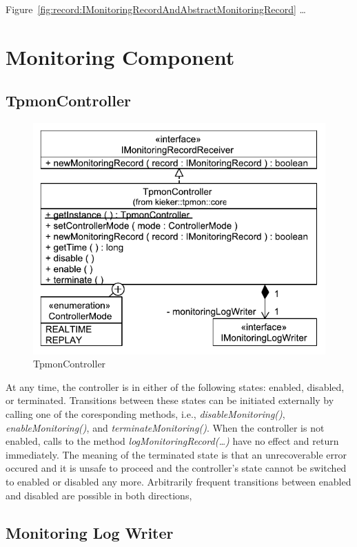 \documentclass[12pt,journal,a4paper,twocolumn,final,oneside]{IEEEtran}%
\begin{document}
Figure~\ref{fig:record:IMonitoringRecordAndAbstractMonitoringRecord} \dots

\section{Monitoring Component}

\subsection{TpmonController}

\begin{figure}[h]\centering
\includegraphics[scale=0.65]{figures/model/kieker_TpmonController}%
\caption{TpmonController}
\end{figure}

At any time, the controller is in either of the following states: %
enabled, disabled, or terminated. Transitions between these states can be %
initiated externally by calling one of the coresponding methods, i.e., %
\textit{disableMonitoring()}, \textit{enableMonitoring()}, and %
\textit{terminateMonitoring()}. When the controller is not enabled, calls to %
the method \textit{logMonitoringRecord(\dots)} have no effect and return %
immediately. The meaning of the terminated state is that an unrecoverable error %
occured and it is unsafe to proceed and the controller's state cannot be switched %
to enabled or disabled any more. Arbitrarily frequent transitions between enabled %
and disabled are possible in both directions, 

\subsection{Monitoring Log Writer}
\end{document}
